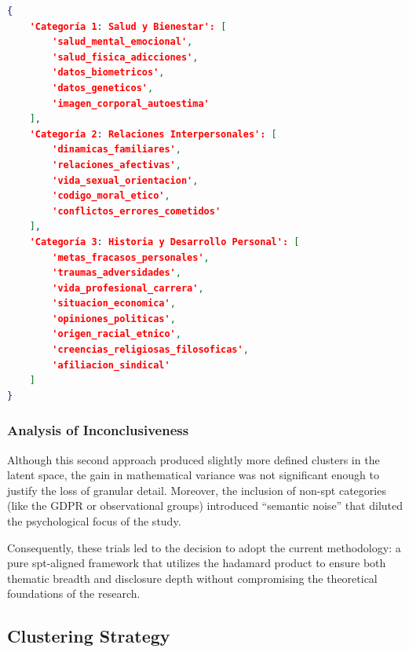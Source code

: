 \begin{lstlisting}[language=json, caption={Consolidated 3-Category Mapping.}, label={lst:consolidated_categories}]
{
    'Categoría 1: Salud y Bienestar': [
        'salud_mental_emocional', 
        'salud_fisica_adicciones',
        'datos_biometricos', 
        'datos_geneticos',
        'imagen_corporal_autoestima'
    ],
    'Categoría 2: Relaciones Interpersonales': [
        'dinamicas_familiares', 
        'relaciones_afectivas',
        'vida_sexual_orientacion', 
        'codigo_moral_etico', 
        'conflictos_errores_cometidos'
    ],
    'Categoría 3: Historia y Desarrollo Personal': [
        'metas_fracasos_personales', 
        'traumas_adversidades', 
        'vida_profesional_carrera',
        'situacion_economica', 
        'opiniones_politicas', 
        'origen_racial_etnico', 
        'creencias_religiosas_filosoficas', 
        'afiliacion_sindical'
    ]
}
\end{lstlisting}

\subsubsection{Analysis of Inconclusiveness}
Although this second approach produced slightly more defined clusters in the latent space, the gain in mathematical variance was not significant enough to justify the loss of granular detail. Moreover, the inclusion of non-spt categories (like the GDPR or observational groups) introduced ``semantic noise'' that diluted the psychological focus of the study.

Consequently, these trials led to the decision to adopt the current methodology: a pure spt-aligned framework that utilizes the hadamard product to ensure both thematic breadth and disclosure depth without compromising the theoretical foundations of the research.



























    \subsection{Clustering Strategy}
